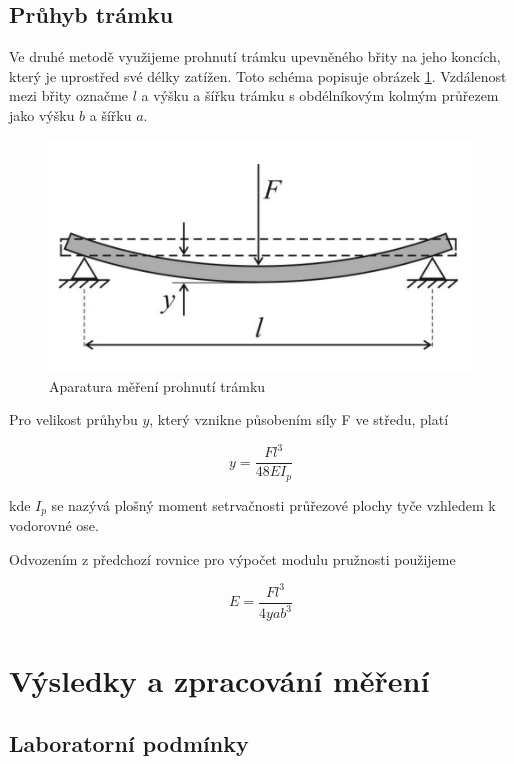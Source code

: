 \subsection{Průhyb trámku}

Ve druhé metodě využijeme prohnutí trámku upevněného břity na jeho koncích, který je uprostřed své délky zatížen. Toto schéma popisuje obrázek \ref{fig:aparatura-prohnuti-tramku}. Vzdálenost mezi břity označme \(l\) a výšku a šířku trámku s obdélníkovým kolmým průřezem jako výšku \(b\) a šířku \(a\).

\begin{figure}[h]
    \centering
    \includegraphics[width=0.5\linewidth]{09 - Měření modulu pružnosti v tahu//Protokol_modul pružnosti//img/Aparatura_průhyb trámku.png}
    \caption{Aparatura měření prohnutí trámku}
    \label{fig:aparatura-prohnuti-tramku}
\end{figure}

Pro velikost průhybu \(y\), který vznikne působením síly F ve středu, platí

\begin{equation}
    y = \frac{F l^3}{48 E I_p}
\end{equation}

kde \(I_p\) se nazývá plošný moment setrvačnosti průřezové plochy tyče vzhledem k vodorovné ose.

Odvozením z předchozí rovnice pro výpočet modulu pružnosti použijeme

\begin{equation}
    E = \frac{F l^3}{4 y a b^3}
\end{equation}


\section{Výsledky a zpracování měření}

\subsection{Laboratorní podmínky}

